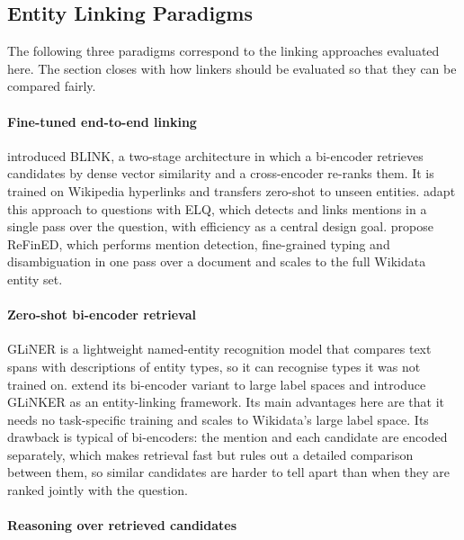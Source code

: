 \subsection{Entity Linking Paradigms}

\label{sec:related-linking}

The following three paradigms correspond to the linking approaches evaluated here.
The section closes with how linkers should be evaluated so that they can be compared fairly.

\paragraph{Fine-tuned end-to-end
linking}

\citet{wu2020blink} introduced BLINK, a two-stage architecture in which a bi-encoder retrieves candidates by dense vector similarity and a cross-encoder re-ranks them.
It is trained on Wikipedia hyperlinks and transfers zero-shot to unseen entities.
\citet{li2020elq} adapt this approach to questions with ELQ, which detects and links mentions in a single pass over the question, with efficiency as a central design goal.
\citet{ayoola2022refined} propose ReFinED, which performs mention detection, fine-grained typing and disambiguation in one pass over a document and scales to the full Wikidata entity set.

\paragraph{Zero-shot bi-encoder
retrieval}

GLiNER is a lightweight named-entity recognition model that compares text spans with descriptions of entity types, so it can recognise types it was not trained on.
\citet{stepanov2026glinker} extend its bi-encoder variant to large label spaces and introduce GLiNKER as an entity-linking framework.
Its main advantages here are that it needs no task-specific training and scales to Wikidata's large label space.
Its drawback is typical of bi-encoders: the mention and each candidate are encoded separately, which makes retrieval fast but rules out a detailed comparison between them, so similar candidates are harder to tell apart than when they are ranked jointly with the question.

\paragraph{Reasoning over retrieved
candidates}

